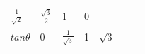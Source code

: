 {{\begin{center}
\begin{xtabular}[t]{|l|l|l|l|l|l|l|}
                \begin{math}\frac{1}{\sqrt{2}}\end{math}
               &
                \begin{math}\frac{\sqrt{3}}{2}\end{math}
               &
        1 &
        0%
     \tabularnewline{}
                \begin{math}tan\theta \end{math}
               &
        0 &
                \begin{math}\frac{1}{\sqrt{3}}\end{math}
               &
        1 &
                \begin{math}\sqrt{3}\end{math}
               &

\end{xtabular}
\end{center}}}
